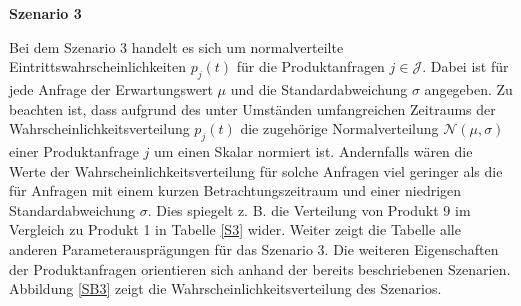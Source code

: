\textbf{Szenario 3}

Bei dem Szenario 3 handelt es sich um normalverteilte Eintrittswahrscheinlichkeiten $p_j(t)$ für die Produktanfragen $j\in\mathcal{J}$. Dabei ist für jede Anfrage der Erwartungswert $\mu$ und die Standardabweichung $\sigma$ angegeben. Zu beachten ist, dass aufgrund des unter Umständen umfangreichen Zeitraums der Wahrscheinlichkeitsverteilung $p_j(t)$ die zugehörige Normalverteilung $\mathcal{N}(\mu,\sigma)$ einer Produktanfrage $j$ um einen Skalar normiert ist. Andernfalls wären die Werte der Wahrscheinlichkeitsverteilung für solche Anfragen viel geringer als die für Anfragen mit einem kurzen Betrachtungszeitraum und einer niedrigen Standardabweichung $\sigma$. Dies spiegelt z. B. die Verteilung von Produkt 9 im Vergleich zu Produkt 1 in Tabelle \ref{S3} wider. Weiter zeigt die Tabelle alle anderen Parameterausprägungen für das Szenario 3. Die weiteren Eigenschaften der Produktanfragen orientieren sich anhand der bereits beschriebenen Szenarien. Abbildung \ref{SB3} zeigt die Wahrscheinlichkeitsverteilung des Szenarios.

